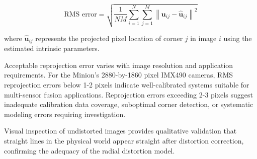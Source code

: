 $$\text{RMS error} = \sqrt{\frac{1}{NM}\sum_{i=1}^{N} \sum_{j=1}^{M} \left\| \mathbf{u}_{ij} - \hat{\mathbf{u}}_{ij} \right\|^2}$$

where $\hat{\mathbf{u}}_{ij}$ represents the projected pixel location of corner $j$ in image $i$ using the estimated intrinsic parameters.

Acceptable reprojection error varies with image resolution and application requirements.
For the Minion's 2880-by-1860 pixel IMX490 cameras, RMS reprojection errors below 1-2 pixels indicate well-calibrated systems suitable for multi-sensor fusion applications.
Reprojection errors exceeding 2-3 pixels suggest inadequate calibration data coverage, suboptimal corner detection, or systematic modeling errors requiring investigation.

Visual inspection of undistorted images provides qualitative validation that straight lines in the physical world appear straight after distortion correction, confirming the adequacy of the radial distortion model.








